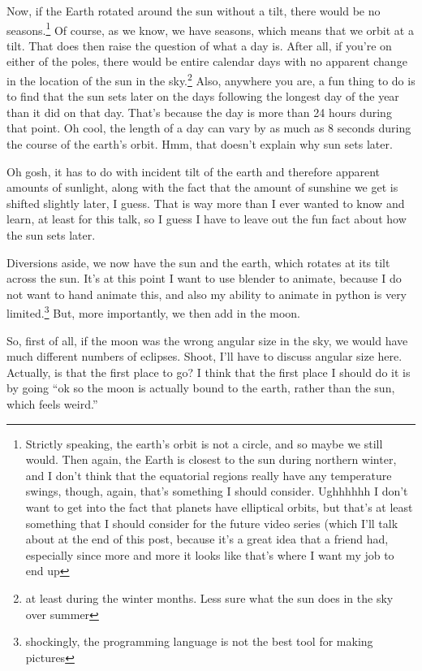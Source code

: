 \documentclass[12pt]{article}[titlepage]
\newcommand{\say}[1]{``#1''}
\newcommand{\1}{\={a}}
\newcommand{\2}{\={e}}
\newcommand{\3}{\={\i}}
\newcommand{\4}{\=o}
\newcommand{\5}{\=u}
\newcommand{\6}{\={A}}
\renewcommand{\,}{\textsuperscript{,}}
\begin{document}
Now, if the Earth rotated around the sun without a tilt, there would be no seasons.\footnote{Strictly speaking, the earth's orbit is not a circle, and so maybe we still would. Then again, the Earth is closest to the sun during northern winter, and I don't think that the equatorial regions really have any temperature swings, though, again, that's something I should consider. Ughhhhhh I don't want to get into the fact that planets have elliptical orbits, but that's at least something that I should consider for the future video series (which I'll talk about at the end of this post, because it's a great idea that a friend had, especially since more and more it looks like that's where I want my job to end up}
Of course, as we know, we have seasons, which means that we orbit at a tilt.
That does then raise the question of what a day is.
After all, if you're on either of the poles, there would be entire calendar days with no apparent change in the location of the sun in the sky.\footnote{at least during the winter months.
Less sure what the sun does in the sky over summer}
Also, anywhere you are, a fun thing to do is to find that the sun sets later on the days following the longest day of the year than it did on that day.
That's because the day is more than 24 hours during that point.
Oh cool, the length of a day can vary by as much as 8 seconds during the course of the earth's orbit.
Hmm, that doesn't explain why sun sets later.

Oh gosh, it has to do with incident tilt of the earth and therefore apparent amounts of sunlight, along with the fact that the amount of sunshine we get is shifted slightly later, I guess.
That is way more than I ever wanted to know and learn, at least for this talk, so I guess I have to leave out the fun fact about how the sun sets later.

Diversions aside, we now have the sun and the earth, which rotates at its tilt across the sun.
It's at this point I want to use blender to animate, because I do not want to hand animate this, and also my ability to animate in python is very limited.\footnote{shockingly, the programming language is not the best tool for making pictures}
But, more importantly, we then add in the moon.

So, first of all, if the moon was the wrong angular size in the sky, we would have much different numbers of eclipses.
Shoot, I'll have to discuss angular size here.
Actually, is that the first place to go?
I think that the first place I should do it is by going \say{ok so the moon is actually bound to the earth, rather than the sun, which feels weird.}
\end{document}
